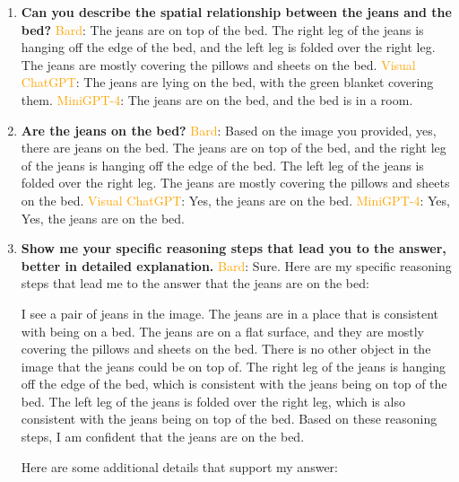 \begin{enumerate}
    \item \textbf{Can you describe the spatial relationship between the jeans and the bed?}
    \subitem \textcolor{orange}{Bard}: 
    The jeans are on top of the bed. The right leg of the jeans is hanging off the edge of the bed, and the left leg is folded over the right leg. The jeans are mostly covering the pillows and sheets on the bed.
    \subitem \textcolor{orange}{Visual ChatGPT}: The jeans are lying on the bed, with the green blanket covering them.
    \subitem \textcolor{orange}{MiniGPT-4}: The jeans are on the bed, and the bed is in a room.
    \item \textbf{Are the jeans on the bed?}
    \subitem \textcolor{orange}{Bard}: 
    Based on the image you provided, yes, there are jeans on the bed. The jeans are on top of the bed, and the right leg of the jeans is hanging off the edge of the bed. The left leg of the jeans is folded over the right leg. The jeans are mostly covering the pillows and sheets on the bed.
    \subitem \textcolor{orange}{Visual ChatGPT}: Yes, the jeans are on the bed.
    \subitem \textcolor{orange}{MiniGPT-4}: Yes, Yes, the jeans are on the bed.
    \item \textbf{Show me your specific reasoning steps that lead you to the answer, better in detailed explanation.}
    \subitem \textcolor{orange}{Bard}: 
    Sure. Here are my specific reasoning steps that lead me to the answer that the jeans are on the bed:
    
    I see a pair of jeans in the image.
    The jeans are in a place that is consistent with being on a bed. The jeans are on a flat surface, and they are mostly covering the pillows and sheets on the bed.
    There is no other object in the image that the jeans could be on top of.
    The right leg of the jeans is hanging off the edge of the bed, which is consistent with the jeans being on top of the bed.
    The left leg of the jeans is folded over the right leg, which is also consistent with the jeans being on top of the bed.
    Based on these reasoning steps, I am confident that the jeans are on the bed.
    
    Here are some additional details that support my answer:
    

\end{enumerate}
